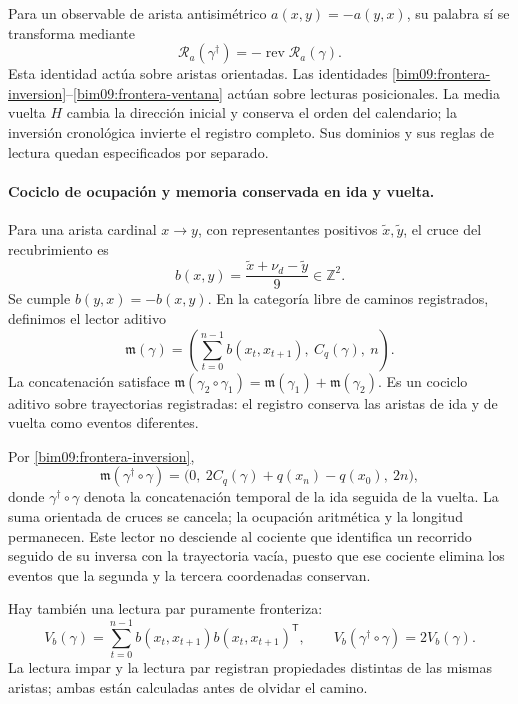 Para un observable de arista antisimétrico $a(x,y)=-a(y,x)$, su palabra
sí se transforma mediante
\[
 \mathcal R_a(\gamma^\dagger)
 =-\operatorname{rev}\mathcal R_a(\gamma).
\]
Esta identidad actúa sobre aristas orientadas. Las identidades
\eqref{bim09:frontera-inversion}--\eqref{bim09:frontera-ventana}
actúan sobre lecturas posicionales. La media vuelta $H$ cambia la
dirección inicial y conserva el orden del calendario; la inversión
cronológica invierte el registro completo. Sus dominios y sus reglas de
lectura quedan especificados por separado.

\paragraph{Cociclo de ocupación y memoria conservada en ida y vuelta.}

Para una arista cardinal $x\to y$, con representantes positivos
$\widetilde x,\widetilde y$, el cruce del recubrimiento es
\[
 b(x,y)=\frac{\widetilde x+\nu_d-\widetilde y}{9}\in\mathbb Z^2.
\]
Se cumple $b(y,x)=-b(x,y)$. En la categoría libre de caminos
registrados, definimos el lector aditivo
\begin{equation}
 \mathfrak m(\gamma)=
 \left(\sum_{t=0}^{n-1}b(x_t,x_{t+1}),\ C_q(\gamma),\ n\right).
 \label{bim09:memoria-aditiva}
\end{equation}
La concatenación satisface
$\mathfrak m(\gamma_2\circ\gamma_1)=
\mathfrak m(\gamma_1)+\mathfrak m(\gamma_2)$.
Es un cociclo aditivo sobre trayectorias registradas: el registro conserva
las aristas de ida y de vuelta como eventos diferentes.

Por \eqref{bim09:frontera-inversion},
\begin{equation}
 \mathfrak m(\gamma^\dagger\circ\gamma)=
 \bigl(0,\ 2C_q(\gamma)+q(x_n)-q(x_0),\ 2n\bigr),
 \label{bim09:memoria-retorno}
\end{equation}
donde $\gamma^\dagger\circ\gamma$ denota la concatenación temporal
de la ida seguida de la vuelta. La suma orientada de cruces se cancela;
la ocupación aritmética y la longitud permanecen. Este lector no
desciende al cociente que identifica un recorrido seguido de su inversa
con la trayectoria vacía, puesto que ese cociente elimina los eventos
que la segunda y la tercera coordenadas conservan.

Hay también una lectura par puramente fronteriza:
\[
 V_b(\gamma)=\sum_{t=0}^{n-1}
 b(x_t,x_{t+1})b(x_t,x_{t+1})^{\mathsf T},\qquad
 V_b(\gamma^\dagger\circ\gamma)=2V_b(\gamma).
\]
La lectura impar y la lectura par registran propiedades distintas de
las mismas aristas; ambas están calculadas antes de olvidar el camino.

